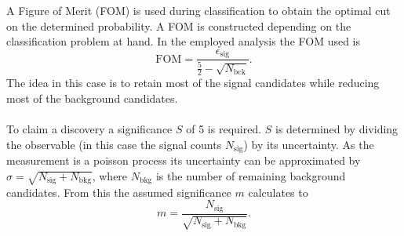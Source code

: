A Figure of Merit (FOM) is used during classification to obtain the optimal cut on the determined probability. A FOM is constructed depending on the classification problem at hand. In the employed analysis the FOM used is 
\begin{equation}
	\mathrm{FOM} = \frac{\epsilon_\mathrm{sig}}{\frac{5}{2}-\sqrt{N_\mathrm{bck}}}.
	\label{eq:fom}
\end{equation}
The idea in this case is to retain most of the signal candidates while reducing most of the background candidates. \\
\\

To claim a discovery a significance $S$ of 5 is required. $S$ is determined by dividing the observable (in this case the signal counts $N_\mathrm{sig}$) by its uncertainty. As the measurement is a poisson process its uncertainty can be approximated by $\sigma = \sqrt{N_\mathrm{sig} + N_\mathrm{bkg}}$, where $N_\mathrm{bkg}$ is the number of remaining background candidates. From this the assumed significance $m$ calculates to
\begin{equation}
	m = \frac{N_\mathrm{sig}}{\sqrt{N_\mathrm{sig} + N_\mathrm{bkg}}}.
	\label{eq:sig}
\end{equation}

 



















